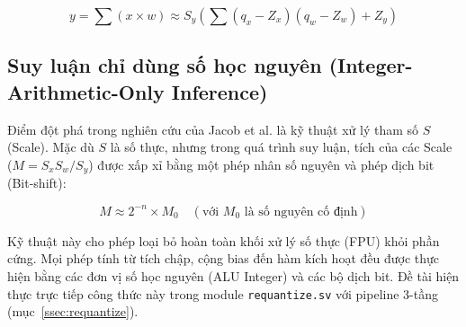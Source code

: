\begin{equation}
    y = \sum (x \times w) \approx S_y \left( \sum (q_x - Z_x)(q_w - Z_w) + Z_y \right)
\end{equation}

\subsection{Suy luận chỉ dùng số học nguyên (Integer-Arithmetic-Only Inference)}
Điểm đột phá trong nghiên cứu của Jacob et al. là kỹ thuật xử lý tham số $S$ (Scale). Mặc dù $S$ là số thực, nhưng trong quá trình suy luận, tích của các Scale ($M = S_x S_w / S_y$) được xấp xỉ bằng một phép nhân số nguyên và phép dịch bit (Bit-shift):

\begin{equation}
    M \approx 2^{-n} \times M_0 \quad (\text{với } M_0 \text{ là số nguyên cố định})
\end{equation}

Kỹ thuật này cho phép loại bỏ hoàn toàn khối xử lý số thực (FPU) khỏi phần cứng.
Mọi phép tính từ tích chập, cộng bias đến hàm kích hoạt đều được thực hiện bằng
các đơn vị số học nguyên (ALU Integer) và các bộ dịch bit. Đề tài hiện thực trực tiếp công thức này trong module \texttt{requantize.sv} với pipeline 3-tầng (mục~\ref{ssec:requantize}).
